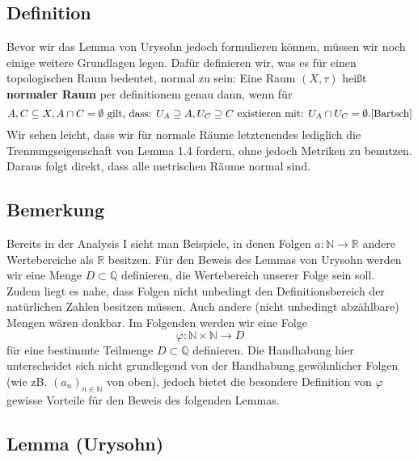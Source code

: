 \documentclass[11pt,leqno]{article}
\begin{document}
\subsection{Definition} 
Bevor wir das Lemma von Urysohn jedoch formulieren können, müssen wir noch einige weitere Grundlagen legen. Dafür definieren wir, 
was es für einen topologischen Raum bedeutet, normal zu sein: Eine Raum $(X,\tau)$ heißt \textbf{normaler Raum} per definitionem genau dann, wenn für
\[A,C\subseteq X,A\cap C=\emptyset\text{ gilt, dass: }U_A\supseteq A,U_C \supseteq C\text{ existieren mit: }U_A\cap U_C=\emptyset. \cite{Bartsch}\]
Wir sehen leicht, dass wir für normale Räume letztenendes lediglich die Trennungseigenschaft von Lemma 1.4 fordern, ohne jedoch Metriken zu benutzen.
Daraus folgt direkt, dass alle metrischen Räume normal sind.

\subsection{Bemerkung}
Bereits in der Analysis I sieht man Beispiele, in denen Folgen $a: \mathbb{N} \rightarrow \mathbb{R}$ andere Wertebereiche als $\mathbb{R}$
besitzen. Für den Beweis des Lemmas von Urysohn werden wir eine Menge $D\subset \mathbb{Q}$ definieren, die Wertebereich unserer Folge sein soll.\\ 
Zudem liegt es nahe, dass Folgen nicht unbedingt den Definitionsbereich der natürlichen Zahlen besitzen müssen. 
Auch andere (nicht unbedingt abzählbare) Mengen wären denkbar. Im Folgenden werden wir eine Folge 
\[\varphi: \mathbb{N} \times \mathbb{N} \rightarrow D\]
für eine bestimmte Teilmenge $D \subset \mathbb{Q}$ definieren. Die Handhabung hier unterscheidet sich nicht grundlegend von der Handhabung 
\glqq gewöhnlicher\grqq{} Folgen (wie zB. $(a_n)_{n \in \mathbb{N}}$ von oben), jedoch bietet die \glqq besondere\grqq{} Definition von 
$\varphi$ gewisse Vorteile für den Beweis des folgenden Lemmas.

\subsection{Lemma (Urysohn)}
\end{document}
